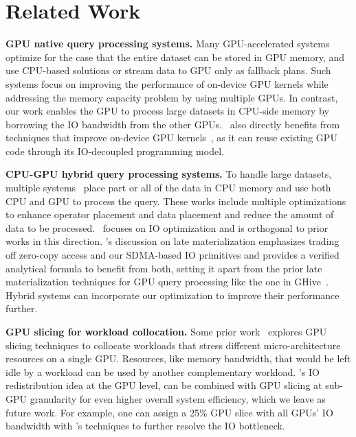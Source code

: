 \section{Related Work}
\label{section:related_works}

\textbf{GPU native query processing systems.}
Many GPU-accelerated systems~\cite{heavyai, mg-join-sigmod-2021, multi-gpu-sort-sigmod-2022} optimize for the case that the entire dataset can be stored in GPU memory, and use CPU-based solutions or stream data to GPU only as fallback plans. 
Such systems focus on improving the performance of on-device GPU kernels while addressing the memory capacity problem by using multiple GPUs.
In contrast, our work enables the GPU to process large datasets in CPU-side memory by borrowing the IO bandwidth from the other GPUs.
\THISWORK\ also directly benefits from techniques that improve on-device GPU kernels~\cite{Funke-sigmod18, crystal-sigmod-20}, as it can reuse existing GPU code through its IO-decoupled programming model.



\noindent
\textbf{CPU-GPU hybrid query processing systems.}
To handle large datasets, multiple systems~\cite{hetexchange-vldb-2019, HERO-VLDB-2017, GDB-TDBSys-2009, mordered-vldb-2022, Ocelot-VLDB-2014, Ocelet-VLDB-2013, GPUQP, FlinkCL} place part or all of the data in CPU memory and use both CPU and GPU to process the query. 
These works include multiple optimizations to enhance operator placement and data placement and reduce the amount of data to be processed.
\THISWORK\ focuses on IO optimization and is orthogonal to prior works in this direction.
\THISWORK's discussion on late materialization emphasizes trading off zero-copy access and our SDMA-based IO primitives and provides a verified analytical formula to benefit from both, setting it apart from the prior late materialization techniques for GPU query processing like the one in GHive~\cite{GHive}.
Hybrid systems can incorporate our optimization to improve their performance further.

\noindent
\textbf{GPU slicing for workload collocation.}
Some prior work~\cite{robroek2024euromlsys, cao2024vldb} explores GPU slicing techniques to collocate workloads that stress different micro-architecture resources on a single GPU.
Resources, like memory bandwidth, that would be left idle by a workload can be used by another complementary workload. 
\THISWORK's IO redistribution idea at the GPU level, can be combined with GPU slicing at sub-GPU granularity for even higher overall system efficiency, which we leave as future work.
For example, one can assign a 25\% GPU slice with all GPUs' IO bandwidth with \THISWORK's techniques to further resolve the IO bottleneck.



%